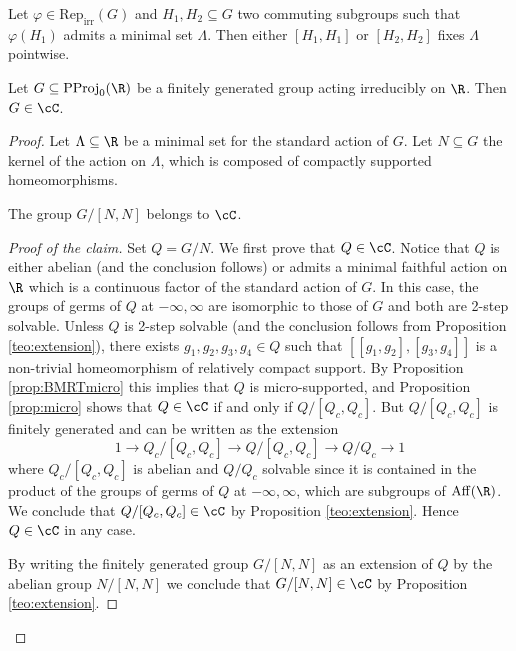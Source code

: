 \documentclass[reqno]{amsart}
\begin{document}
\begin{lema} \label{lema:minimalProducto}
Let $\varphi \in \mathrm{Rep}_\mathrm{irr}(G)$ and $H_1, H_2 \subseteq G$ two commuting subgroups such that $\varphi(H_1)$ admits a minimal set $\Lambda$. Then either $[H_1, H_1]$ or $[H_2, H_2]$ fixes $\Lambda$ pointwise.
\end{lema}

\begin{prop} \label{prop:irreduciblePL}
Let $G \subseteq \mathrm{PProj}_0(\R)$ be a finitely generated group acting irreducibly on $\R$. Then $G \in \cC$.
\end{prop}
\begin{proof}
Let $\Lambda \subseteq \R$ be a minimal set for the standard action of $G$. Let $N \subseteq G$ the kernel of the action on $\Lambda$, which is composed of compactly supported homeomorphisms.

\setcounter{claimnum}{0}
\begin{claimnum}
The group $G/[N,N]$ belongs to $\cC$. 
\end{claimnum}
\begin{proof}[Proof of the claim]
Set $Q = G/N$. We first prove that $Q \in \cC$. Notice that $Q$ is either abelian (and the conclusion follows) or admits a minimal faithful action on $\R$ which is a continuous factor of the standard action of $G$. In this case, the groups of germs of $Q$ at $-\infty, \infty$ are isomorphic to those of $G$ and both are 2-step solvable. Unless $Q$ is 2-step solvable (and the conclusion follows from Proposition \ref{teo:extension}), there exists $g_1, g_2, g_3, g_4 \in Q$ such that $[[g_1, g_2], [g_3, g_4]]$ is a non-trivial homeomorphism of relatively compact support. By Proposition \ref{prop:BMRTmicro} this implies that $Q$ is micro-supported, and Proposition \ref{prop:micro} shows that $Q \in \cC$ if and only if $Q/[Q_c, Q_c]$. But $Q/[Q_c, Q_c]$ is finitely generated and can be written as the extension
\begin{equation} \label{eq:extension}
	1 \longrightarrow Q_c/[Q_c, Q_c] \longrightarrow Q/[Q_c, Q_c] \longrightarrow Q/Q_c \longrightarrow 1
\end{equation}
where $Q_c/[Q_c, Q_c]$ is abelian and $Q/Q_c$ solvable since it is contained in the product of the groups of germs of $Q$ at $-\infty, \infty$, which are subgroups of $\mathrm{Aff}(\R)$. We conclude that $Q/[Q_c, Q_c] \in \cC$ by Proposition \ref{teo:extension}. Hence $Q \in \cC$ in any case.

By writing the finitely generated group $G/[N,N]$ as an extension of $Q$ by the abelian group $N/[N,N]$ we conclude that $G/[N,N] \in \cC$ by Proposition \ref{teo:extension}.
\end{proof}


\end{proof}
\end{document}
